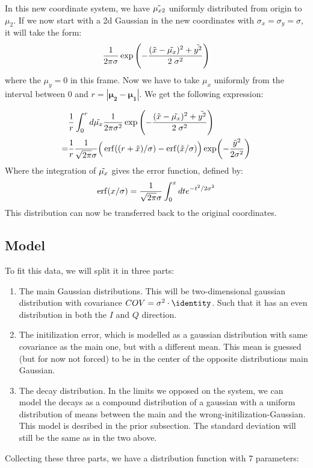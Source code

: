 In this new coordinate system, we have $\Tilde{\mu_{x2}}$ uniformly distributed from origin to $\mu_2$. If we now start with a 2d Gaussian in the new coordinates with $\sigma_x = \sigma_y = \sigma$, it will take the form:
\begin{equation}
    \frac{1}{2 \pi \sigma} \exp \left(- \frac{(\Tilde{x} - \Tilde{\mu_x})^2 + \Tilde{y^2}}{2 \; \sigma^2} \right)
\end{equation}
where the $\mu_y = 0$ in this frame. Now we have to take $\mu_x$ uniformly from the interval between $0$ and $r = |\boldsymbol{\mu_{2}} - \boldsymbol{\mu_{1}}|$. We get the following expression:

\begin{align}
    &\frac{1}{r} \int_0^r d\Tilde{\mu_x} \frac{1}{2 \pi \sigma^2} \exp \left(- \frac{(\Tilde{x} - \Tilde{\mu_x})^2 + \Tilde{y^2}}{2 \; \sigma^2} \right) \\
    = &\frac{1}{r}\frac{1}{\sqrt{2 \pi} \sigma} \Big(\erf((r + \Tilde{x}) / \sigma) - \erf(\Tilde{x} / \sigma)\Big) \exp(-\frac{\Tilde{y}^2}{2 \sigma^2})
\end{align}
Where the integration of $\Tilde{\mu_x}$ gives the error function, defined by: 
\begin{equation}
    \erf(x/\sigma) = \frac{1}{\sqrt{2 \pi }\sigma} \int_0^x dt e^{-t^2/2\sigma^2}
\end{equation}
This distribution can now be transferred back to the original coordinates. 

\subsection{Model}
To fit this data, we will split it in three parts:
\begin{enumerate}
    \item The main Gaussian distributions. This will be two-dimensional gaussian distribution with covariance $COV = \sigma^2 \cdot \identity$. Such that it has an even distribution in both the $I$ and $Q$ direction.
    \item The initilization error, which is modelled as a gaussian distribution with same covariance as the main one, but with a different mean. This mean is guessed (but for now not forced) to be in the center of the opposite distributions main Gaussian.
    \item The decay distribution. In the limits we opposed on the system, we can model the decays as a compound distribution of a gaussian with a uniform distribution of means between the main and the wrong-initilization-Gaussian. This model is desribed in the prior subsection. The standard deviation will still be the same as in the two above.  
\end{enumerate}
\noindent
Collecting these three parts, we have a distribution function with 7 parameters:

